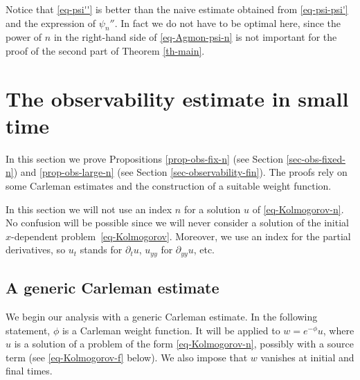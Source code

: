 \documentclass[10pt]{amsart}
\theoremstyle{plain}
\theoremstyle{definition}
\newcommand{\1}{\mathds 1}
\let\vf\phi
\begin{document}
Notice that \eqref{eq-psi''} is better than the naive estimate obtained from \eqref{eq-psi-psi'} and the expression of $\psi_n''$. In fact we do not have to be optimal here, since the power of $n$ in the right-hand side of \eqref{eq-Agmon-psi-n} is not important for the proof of the second part of Theorem \ref{th-main}.

\section{The observability estimate in small time} \label{sec-Carleman}

In this section we prove Propositions \ref{prop-obs-fix-n} (see Section \ref{sec-obs-fixed-n}) and \ref{prop-obs-large-n} (see Section \ref{sec-observability-fin}). The proofs rely on some Carleman estimates and the construction of a suitable weight function.

In this section we will not use an index $n$ for a solution $u$ of \eqref{eq-Kolmogorov-n}. No confusion will be possible since we will never consider a solution of the initial $x$-dependent problem~\eqref{eq-Kolmogorov}. Moreover, we use an index for the partial derivatives, so $u_t$ stands for $\partial_t u$, $u_{yy}$ for $\partial_{yy} u$, etc.

\subsection{A generic Carleman estimate}

We begin our analysis with a generic Carleman estimate. In the following statement, $\vf$ is a Carleman weight function. It will be applied to $w = e^{-\vf} u$, where $u$ is a solution of a problem of the form \eqref{eq-Kolmogorov-n}, possibly with a source term (see \eqref{eq-Kolmogorov-f} below). We also impose that $w$ vanishes at initial and final times.
\end{document}
